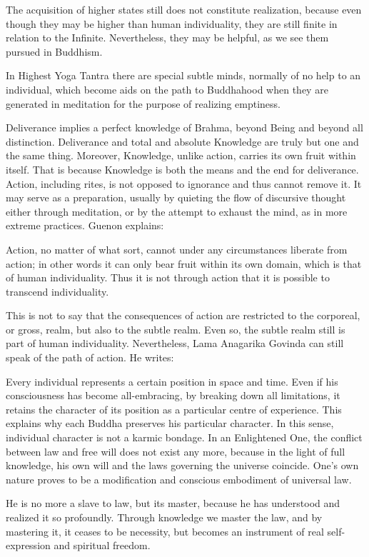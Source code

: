The acquisition of higher states still does not constitute realization, because even though they may be higher than human individuality, they are still finite in relation to the Infinite. Nevertheless, they may be helpful, as we see them pursued in Buddhism.

\begin{quotex}

In Highest Yoga Tantra there are special subtle minds, normally of no help to an individual, which become aids on the path to Buddhahood when they are generated in meditation for the purpose of realizing emptiness. 

\end{quotex}
Deliverance implies a perfect knowledge of Brahma, beyond Being and beyond all distinction. Deliverance and total and absolute Knowledge are truly but one and the same thing. Moreover, Knowledge, unlike action, carries its own fruit within itself. That is because Knowledge is both the means and the end for deliverance. Action, including rites, is not opposed to ignorance and thus cannot remove it. It may serve as a preparation, usually by quieting the flow of discursive thought either through meditation, or by the attempt to exhaust the mind, as in more extreme practices. Guenon explains:

\begin{quotex}
Action, no matter of what sort, cannot under any circumstances liberate from action; in other words it can only bear fruit within its own domain, which is that of human individuality. Thus it is not through action that it is possible to transcend individuality.

\end{quotex}
This is not to say that the consequences of action are restricted to the corporeal, or gross, realm, but also to the subtle realm. Even so, the subtle realm still is part of human individuality. Nevertheless, Lama Anagarika Govinda can still speak of the path of action. He writes:

\begin{quotex}
Every individual represents a certain position in space and time. Even if his consciousness has become all-embracing, by breaking down all limitations, it retains the character of its position as a particular centre of experience. This explains why each Buddha preserves his particular character. In this sense, individual character is not a karmic bondage. In an Enlightened One, the conflict between law and free will does not exist any more, because in the light of full knowledge, his own will and the laws governing the universe coincide. One's own nature proves to be a modification and conscious embodiment of universal law.

He is no more a slave to law, but its master, because he has understood and realized it so profoundly. Through knowledge we master the law, and by mastering it, it ceases to be necessity, but becomes an instrument of real self-expression and spiritual freedom. 

\end{quotex}


